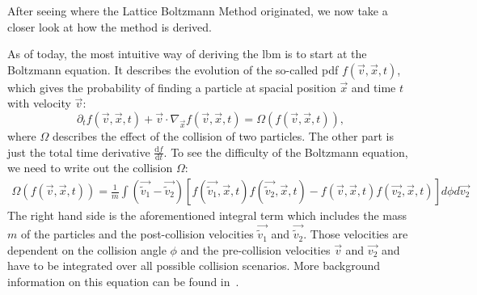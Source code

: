 After seeing where the Lattice Boltzmann Method originated, we now take a closer look at how the method is derived.

As of today, the most intuitive way of deriving the \gls{lbm} is to start at the Boltzmann equation.
It describes the evolution of the so-called \gls{pdf} $f(\vec{v},\vec{x},t)$, which gives the probability of finding a particle at spacial position $\vec{x}$ and time $t$ with velocity $\vec{v}$:
\begin{equation}
  \label{eq: Boltzmann transport equation}
  \partial_t f(\vec{v},\vec{x},t) + \vec{v} \cdot \nabla_{\vec{x}} f(\vec{v},\vec{x},t) = \Omega\left(f(\vec{v},\vec{x},t)\right),
\end{equation}
where $\Omega$ describes the effect of the collision of two particles. The other part is just the total time derivative $\frac{\text{d}f}{\text{d}t}$. To see the difficulty of the Boltzmann equation, we need to write out the collision $\Omega$:
\begin{equation}
  \label{eq: Collision of boltzmann equation}
  \begin{aligned}
 \Omega\left(f(\vec{v},\vec{x},t)\right) =\frac{1}{m}
  \int \left( \vec{\tilde{v}_1}-\vec{\tilde{v}_2}\right)
  \left[
    f(\vec{\tilde{v}_1},\vec{x},t)f(\vec{\tilde{v}_2},\vec{x},t)
    -f(\vec{v},\vec{x},t)f(\vec{v_2},\vec{x},t)
  \right] d\phi d\vec{v_2}
\end{aligned}
\end{equation}
The right hand side is the aforementioned integral term which includes the mass $m$ of the particles and the post-collision velocities $\vec{\tilde{v}_1}$ and $\vec{\tilde{v}_2}$.
Those velocities are dependent on the collision angle $\phi$ and the pre-collision velocities $\vec{v}$ and $\vec{v_2}$ and have to be integrated over all possible collision scenarios.
More background information on this equation can be found in~\cite{harris2004introduction}.

